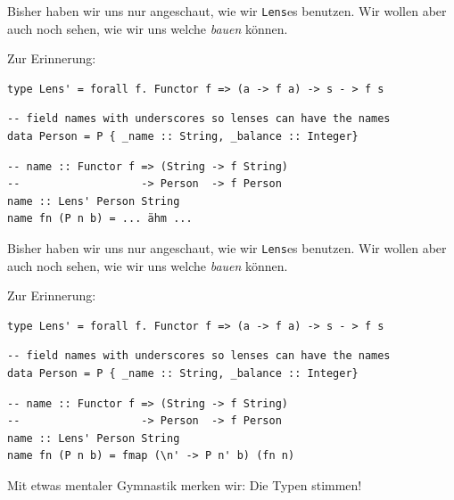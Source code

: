 \documentclass{beamer}
\begin{document}

\begin{frame}[fragile]

Bisher haben wir uns nur angeschaut, wie wir \texttt{Lens}es benutzen. Wir wollen aber auch noch sehen, wie wir uns welche \emph{bauen} können.
\smallskip
\smallskip

Zur Erinnerung:
\begin{verbatim}
type Lens' = forall f. Functor f => (a -> f a) -> s - > f s
\end{verbatim}
\smallskip

\begin{verbatim}
-- field names with underscores so lenses can have the names
data Person = P { _name :: String, _balance :: Integer}
\end{verbatim}
\bigskip

\begin{verbatim}
-- name :: Functor f => (String -> f String)
--                   -> Person  -> f Person
name :: Lens' Person String
name fn (P n b) = ... ähm ...
\end{verbatim}

\end{frame}


\begin{frame}[fragile]

Bisher haben wir uns nur angeschaut, wie wir \texttt{Lens}es benutzen. Wir wollen aber auch noch sehen, wie wir uns welche \emph{bauen} können.
\smallskip
\smallskip

Zur Erinnerung:
\begin{verbatim}
type Lens' = forall f. Functor f => (a -> f a) -> s - > f s
\end{verbatim}
\smallskip

\begin{verbatim}
-- field names with underscores so lenses can have the names
data Person = P { _name :: String, _balance :: Integer}
\end{verbatim}
\bigskip

\begin{verbatim}
-- name :: Functor f => (String -> f String)
--                   -> Person  -> f Person
name :: Lens' Person String
name fn (P n b) = fmap (\n' -> P n' b) (fn n)
\end{verbatim}
\pause

Mit etwas mentaler Gymnastik merken wir: Die Typen stimmen!

\end{frame}
\end{document}
